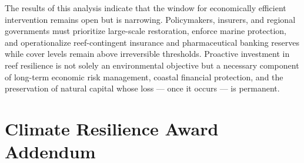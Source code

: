 \documentclass[10pt,letterpaper]{article}
\begin{document}
The results of this analysis indicate that the window for economically efficient intervention remains open but is narrowing. Policymakers, insurers, and regional governments must prioritize large-scale restoration, enforce marine protection, and operationalize reef-contingent insurance and pharmaceutical banking reserves while cover levels remain above irreversible thresholds. Proactive investment in reef resilience is not solely an environmental objective but a necessary component of long-term economic risk management, coastal financial protection, and the preservation of natural capital whose loss --- once it occurs --- is permanent.

\newpage
{}
\section*{Climate Resilience Award Addendum}
\end{document}
